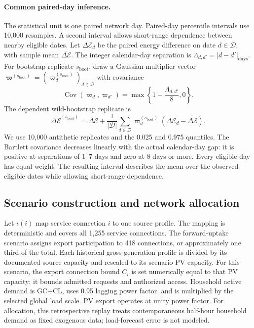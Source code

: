 \documentclass[11pt]{article}
\begin{document}
\paragraph{Common paired-day inference.}
The statistical unit is one paired network day. Paired-day percentile intervals
use 10,000 resamples. A second interval allows short-range dependence between
nearby eligible dates. Let $\Delta\mathcal E_d$ be the paired energy difference
on date $d\in\mathcal D$, with sample mean
$\overline{\Delta\mathcal E}$. The integer calendar-day separation is
$\Lambda_{d,d'}=|d-d'|_{\mathrm{days}}$.
For bootstrap replicate $s_{\mathrm{boot}}$, draw a Gaussian multiplier vector
$\boldsymbol\varpi^{(s_{\mathrm{boot}})}=(\varpi_d^{(s_{\mathrm{boot}})})_{d\in\mathcal D}$ with covariance
\begin{equation}
\operatorname{Cov}(\varpi_d,\varpi_{d'})=
\max\!\left\{1-\frac{\Lambda_{d,d'}}{8},0\right\}.
\label{eq:supp_au_wild_covariance}
\end{equation}
The dependent wild-bootstrap replicate is
\begin{equation}
\overline{\Delta\mathcal E}^{(s_{\mathrm{boot}})}
=\overline{\Delta\mathcal E}+\frac{1}{|\mathcal D|}
\sum_{d\in\mathcal D}\varpi_d^{(s_{\mathrm{boot}})}
(\Delta\mathcal E_d-\overline{\Delta\mathcal E}).
\label{eq:supp_au_wild_replicate}
\end{equation}
We use 10,000 antithetic replicates and the 0.025 and 0.975 quantiles. The
Bartlett covariance decreases linearly with the actual calendar-day gap:
it is positive at separations of 1--7 days and zero at 8 days or more.
Every eligible day has equal weight. The resulting interval describes the mean
over the observed eligible dates while allowing short-range dependence.

\subsection{Scenario construction and network allocation}
\label{supp:au_construction}

Let $\iota(i)$ map service connection $i$ to one source profile. The mapping is
deterministic and covers all 1,255 service connections. The forward-uptake
scenario assigns export participation to 418 connections, or approximately one
third of the total. Each historical gross-generation profile is divided by its
documented source capacity and rescaled to its scenario PV capacity. For this
scenario, the export connection bound $C_i$ is set numerically equal to that
PV capacity; it bounds admitted requests and authorized access. Household
active demand is GC+CL, uses 0.95 lagging power factor, and is multiplied by the
selected global load scale. PV export operates at unity power factor.
For allocation, this retrospective replay treats contemporaneous half-hour
household demand as fixed exogenous data; load-forecast error is not modeled.
\end{document}
